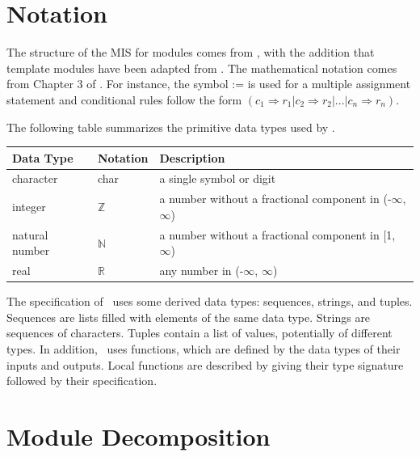 \documentclass[10pt, titlepage]{article}
\begin{document}
\newpage
\section{Notation}


The structure of the MIS for modules comes from \cite{HoffmanAndStrooper1995},
with the addition that template modules have been adapted from
\cite{GhezziEtAl2003}.  The mathematical notation comes from Chapter 3 of
\cite{HoffmanAndStrooper1995}.  For instance, the symbol := is used for a
multiple assignment statement and conditional rules follow the form $(c_1
\Rightarrow r_1 | c_2 \Rightarrow r_2 | ... | c_n \Rightarrow r_n )$.

The following table summarizes the primitive data types used by \progname. 

\begin{center}
\renewcommand{\arraystretch}{1.2}
\noindent 
\begin{tabular}{l l p{7.5cm}} 
\toprule 
\textbf{Data Type} & \textbf{Notation} & \textbf{Description}\\ 
\midrule
character & char & a single symbol or digit\\
integer & $\mathbb{Z}$ & a number without a fractional component in (-$\infty$, $\infty$) \\
natural number & $\mathbb{N}$ & a number without a fractional component in [1, $\infty$) \\
real & $\mathbb{R}$ & any number in (-$\infty$, $\infty$)\\
\bottomrule
\end{tabular} 
\end{center}

\noindent
The specification of \progname \ uses some derived data types: sequences, strings, and
tuples. Sequences are lists filled with elements of the same data type. Strings
are sequences of characters. Tuples contain a list of values, potentially of
different types. In addition, \progname \ uses functions, which
are defined by the data types of their inputs and outputs. Local functions are
described by giving their type signature followed by their specification.

\newpage
\section{Module Decomposition}
\end{document}
